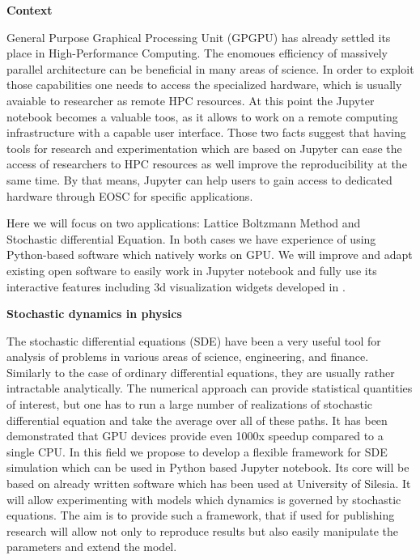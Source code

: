 \begin{task}[
  title=Application: Reproducible research based on GPU,
  id=application-gpu,
  lead=SIL,
  PM=12,
  wphases={4-36},
  partners={EGI}
]


\textbf{Context}

 General Purpose Graphical Processing Unit (GPGPU) has already settled its place in High-Performance Computing. The enomoues efficiency of massively parallel architecture can be beneficial in many areas of science. In order to exploit those capabilities one needs to access the specialized hardware, which is usually avaiable to researcher as remote HPC resources. At this point the Jupyter notebook becomes a valuable toos, as it allows to work on a remote computing infrastructure with a capable user interface. Those two facts suggest that having tools for research and experimentation which are based on Jupyter can ease the access of researchers to HPC resources as well improve the reproducibility at the same time. By that means, Jupyter can help users to gain access to dedicated hardware through EOSC for specific applications.

Here we will focus on two applications: Lattice Boltzmann Method and Stochastic differential Equation. In both cases we have experience of using Python-based software which natively works on GPU. We will improve and adapt existing open software to easily work in Jupyter notebook and fully use its interactive features including 3d visualization widgets developed in .


\textbf{Stochastic dynamics in physics}

The stochastic differential equations (SDE) have been a very useful tool for analysis of problems in various areas of science, engineering, and finance. Similarly to the case of ordinary differential equations, they are usually rather intractable analytically. The numerical approach can provide  statistical quantities of interest, but one has to run a large number of realizations of stochastic differential equation and take the average over all of these paths. It has been demonstrated that GPU devices provide even 1000x speedup compared to a single CPU\cite{januszewski2010accelerating,spiechowicz2015gpu}. In this field we propose to develop a flexible framework for SDE simulation which can be used in Python based Jupyter notebook. Its core will be based on already written software which has been used at University of Silesia.  It will allow experimenting with models which dynamics is governed by stochastic equations. The aim is to provide such a framework, that if used for publishing research will allow not only to reproduce results but also easily manipulate the parameters and extend the model.


\end{task}
